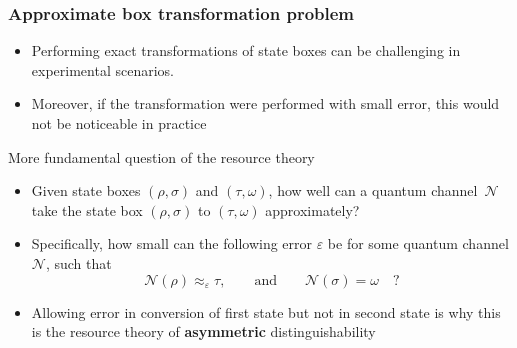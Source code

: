 \documentclass[usenames,dvipsnames,handout]{beamer}
\begin{document}
\begin{frame}
\frametitle{Approximate box transformation problem}

\begin{itemize}
\pause
\item 
Performing exact transformations of state boxes can be challenging in experimental scenarios.

\pause
\vspace{.1in}
\item Moreover, if the transformation were performed with small error, this would not be noticeable in practice


\end{itemize}

\pause
\begin{block}{More fundamental question of the resource theory}

\begin{itemize}

\pause
\item Given state boxes $(\rho, \sigma)$ and  $(\tau, \omega)$, how well can a quantum channel~$\mathcal{N}$  take the state box $(\rho, \sigma)$ to  $(\tau, \omega)$ approximately?

\pause
\vspace{.1in}
\item Specifically, how small can the following error $\varepsilon$ be for some quantum channel $\mathcal{N}$, such that
$$
\mathcal{N}(\rho) \approx_{\varepsilon} \tau, \qquad \text{and} \qquad \mathcal{N}(\sigma) = \omega   \quad ?
$$

\pause
\item Allowing error in conversion of first state but not in second state is why this is the resource theory of {\color{MidnightBlue}\textbf{asymmetric}} distinguishability

\end{itemize}

\end{block}


\end{frame}
\end{document}
